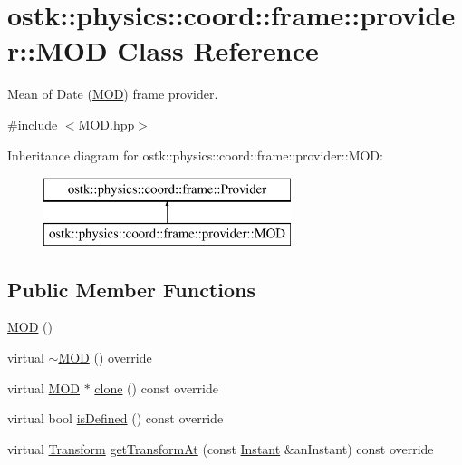 \hypertarget{classostk_1_1physics_1_1coord_1_1frame_1_1provider_1_1_m_o_d}{}\section{ostk\+:\+:physics\+:\+:coord\+:\+:frame\+:\+:provider\+:\+:M\+OD Class Reference}
\label{classostk_1_1physics_1_1coord_1_1frame_1_1provider_1_1_m_o_d}


Mean of Date (\hyperlink{classostk_1_1physics_1_1coord_1_1frame_1_1provider_1_1_m_o_d}{M\+OD}) frame provider.  




{\ttfamily \#include $<$M\+O\+D.\+hpp$>$}

Inheritance diagram for ostk\+:\+:physics\+:\+:coord\+:\+:frame\+:\+:provider\+:\+:M\+OD\+:\begin{figure}[H]
\begin{center}
\leavevmode
\includegraphics[height=2.000000cm]{classostk_1_1physics_1_1coord_1_1frame_1_1provider_1_1_m_o_d}
\end{center}
\end{figure}
\subsection*{Public Member Functions}
\begin{DoxyCompactItemize}
\item 
\hyperlink{classostk_1_1physics_1_1coord_1_1frame_1_1provider_1_1_m_o_d_a5f10eb22a5e4522253886d39577b8620}{M\+OD} ()
\item 
virtual \hyperlink{classostk_1_1physics_1_1coord_1_1frame_1_1provider_1_1_m_o_d_adedfb79ae3a617c0cfb963bec8d0ecc8}{$\sim$\+M\+OD} () override
\item 
virtual \hyperlink{classostk_1_1physics_1_1coord_1_1frame_1_1provider_1_1_m_o_d}{M\+OD} $\ast$ \hyperlink{classostk_1_1physics_1_1coord_1_1frame_1_1provider_1_1_m_o_d_ac7d8c3c340359b0bf13728aa93d285e4}{clone} () const override
\item 
virtual bool \hyperlink{classostk_1_1physics_1_1coord_1_1frame_1_1provider_1_1_m_o_d_a0b6a40a222857ad032f5d5a8d228ab16}{is\+Defined} () const override
\item 
virtual \hyperlink{classostk_1_1physics_1_1coord_1_1_transform}{Transform} \hyperlink{classostk_1_1physics_1_1coord_1_1frame_1_1provider_1_1_m_o_d_abe3960b9717d20f5e7945407c76ddb96}{get\+Transform\+At} (const \hyperlink{classostk_1_1physics_1_1time_1_1_instant}{Instant} \&an\+Instant) const override
\end{DoxyCompactItemize}


